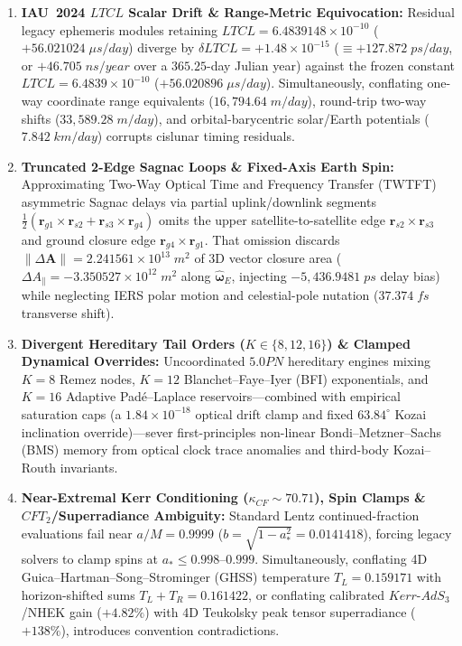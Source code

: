 \documentclass[11pt,a4paper,reqno]{article}
\def\mathrm#1{#1}%
\def\LTCL{LTCL}%
\theoremstyle{plain}
\theoremstyle{definition}
\theoremstyle{remark}
\numberwithin{equation}{section}
\numberwithin{table}{section}
\newcommand{\LTCL}{L_{\mathrm{TCL}}}
\begin{document}
\begin{enumerate}[label=\textbf{(\arabic*)}, leftmargin=2.2em, before=\raggedright]
  \item \textbf{IAU~2024 $\LTCL$ Scalar Drift \& Range-Metric Equivocation:} Residual legacy ephemeris modules retaining $\LTCL = 6.4839148 \times 10^{-10}$ ($+56.021024\;\mu\mathrm{s/day}$) diverge by $\delta\LTCL = +1.48 \times 10^{-15}$ ($\equiv +127.872\;\mathrm{ps/day}$, or $+46.705\;\mathrm{ns/year}$ over a $365.25$-day Julian year) against the frozen constant $\LTCL = 6.4839 \times 10^{-10}$ ($+56.020896\;\mu\mathrm{s/day}$). Simultaneously, conflating one-way coordinate range equivalents ($16{,}794.64\;\mathrm{m/day}$), round-trip two-way shifts ($33{,}589.28\;\mathrm{m/day}$), and orbital-barycentric solar/Earth potentials ($7.842\;\mathrm{km/day}$) corrupts cislunar timing residuals.
  \item \textbf{Truncated 2-Edge Sagnac Loops \& Fixed-Axis Earth Spin:} Approximating Two-Way Optical Time and Frequency Transfer (TWTFT) asymmetric Sagnac delays via partial uplink/downlink segments $\frac{1}{2}(\mathbf{r}_{g1}\times\mathbf{r}_{s2} + \mathbf{r}_{s3}\times\mathbf{r}_{g4})$ omits the upper satellite-to-satellite edge $\mathbf{r}_{s2}\times\mathbf{r}_{s3}$ and ground closure edge $\mathbf{r}_{g4}\times\mathbf{r}_{g1}$. That omission discards $\|\Delta\mathbf{A}\| = 2.241561\times 10^{13}\;\mathrm{m}^2$ of 3D vector closure area ($\Delta A_\parallel = -3.350527\times 10^{12}\;\mathrm{m}^2$ along $\hat{\boldsymbol{\omega}}_E$, injecting $-5{,}436.9481\;\mathrm{ps}$ delay bias) while neglecting IERS polar motion and celestial-pole nutation ($37.374\;\mathrm{fs}$ transverse shift).
  \item \textbf{Divergent Hereditary Tail Orders ($K \in \{8,12,16\}$) \& Clamped Dynamical Overrides:} Uncoordinated $5.0\mathrm{PN}$ hereditary engines mixing $K=8$ Remez nodes, $K=12$ Blanchet--Faye--Iyer (BFI) exponentials, and $K=16$ Adaptive Pad\'e--Laplace reservoirs---combined with empirical saturation caps (a $1.84\times 10^{-18}$ optical drift clamp and fixed $63.84^\circ$ Kozai inclination override)---sever first-principles non-linear Bondi--Metzner--Sachs (BMS) memory from optical clock trace anomalies and third-body Kozai--Routh invariants.
  \item \textbf{Near-Extremal Kerr Conditioning ($\kappa_{\mathrm{CF}} \sim 70.71$), Spin Clamps \& $\mathrm{CFT}_2$/Superradiance Ambiguity:} Standard Lentz continued-fraction evaluations fail near $a/M = 0.9999$ ($b = \sqrt{1-a_*^2} = 0.0141418$), forcing legacy solvers to clamp spins at $a_* \le 0.998\text{--}0.999$. Simultaneously, conflating 4D Guica--Hartman--Song--Strominger (GHSS) temperature $T_L = 0.159171$ with horizon-shifted sums $T_L+T_R = 0.161422$, or conflating calibrated $\mathrm{Kerr\text{-}AdS}_3$/NHEK gain ($+4.82\%$) with 4D Teukolsky peak tensor superradiance ($+138\%$), introduces convention contradictions.

\end{enumerate}
\end{document}
